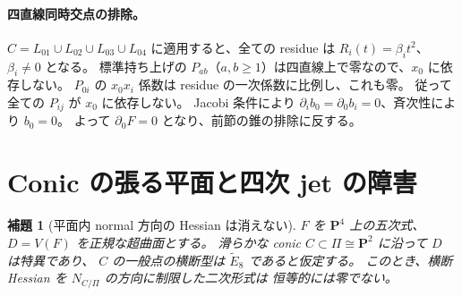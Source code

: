 \documentclass[11pt,a4paper]{ltjsarticle}
\newcommand{\PP}{\mathbf P}\renewcommand{\AA}{\mathbf A}
\newtheorem{lemma}[theorem]{補題}
\theoremstyle{remark}\newtheorem{remark}[theorem]{注意}
\begin{document}
\paragraph{四直線同時交点の排除。}
$C=L_{01}\cup L_{02}\cup L_{03}\cup L_{04}$ に適用すると、全ての residue は
$R_i(t)=\beta_i t^2$、$\beta_i\ne0$ となる。
標準持ち上げの $P_{ab}$（$a,b\ge1$）は四直線上で零なので、$x_0$ に依存しない。
$P_{0i}$ の $x_0x_i$ 係数は residue の一次係数に比例し、これも零。
従って全ての $P_{ij}$ が $x_0$ に依存しない。
Jacobi 条件により $\partial_i b_0=\partial_0b_i=0$、斉次性により $b_0=0$。
よって $\partial_0F=0$ となり、前節の錐の排除に反する。


\section{Conic の張る平面と四次 jet の障害}

\begin{lemma}[平面内 normal 方向の Hessian は消えない]\label{lem:conic-plane}
$F$ を $\PP^4$ 上の五次式、$D=V(F)$ を正規な超曲面とする。
滑らかな conic $C\subset\Pi\cong\PP^2$ に沿って $D$ は特異であり、
$C$ の一般点の横断型は $\widetilde E_8$ であると仮定する。
このとき、横断 Hessian を $N_{C/\Pi}$ の方向に制限した二次形式は
恒等的には零でない。
\end{lemma}
\end{document}
